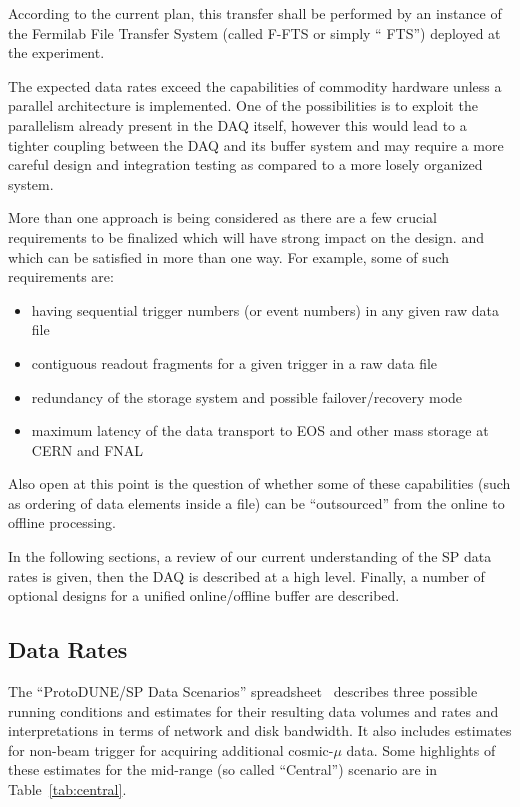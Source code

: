 \documentclass[pdftex,12pt,letter]{article}
\newcommand{\pd}{ProtoDUNE\xspace}
\begin{document}
According to the current plan, this transfer shall be performed by
an instance of the Fermilab File Transfer System (called F-FTS or simply `` FTS'') deployed
at the experiment.

The expected data rates exceed the capabilities of commodity hardware
unless a parallel architecture is implemented. One of the possibilities is to
exploit the parallelism already present in the DAQ itself, however this
would lead to a tighter coupling between the DAQ and its buffer system and
may require a more careful design and integration testing as compared to a more
losely organized system.

More than one approach is being considered as there are a few crucial
requirements to be finalized which will have strong impact on the design.
and which can be satisfied in more than one way. For example, some of such
requirements are:

\begin{itemize}

\item having sequential trigger numbers (or event numbers) in any given raw data file

\item contiguous readout fragments for a given trigger in a raw data file

\item redundancy of the storage system and possible failover/recovery mode

\item maximum latency of the data transport to EOS and other mass storage at CERN and FNAL

\end{itemize}

\noindent Also open at this point is the question of whether some of these capabilities (such as ordering of data elements
inside a file) can be ``outsourced'' from the online to offline processing.

In the following sections, a review of our current understanding of
the SP data rates is given, then the DAQ is described at a high level.
Finally, a number of optional designs for a unified online/offline
buffer are described.

\subsection{Data Rates}

The ``\pd/SP Data Scenarios'' spreadsheet~\cite{data-scenarios}
describes three possible running conditions and estimates for their
resulting data volumes and rates and interpretations in terms of
network and disk bandwidth.  It also includes estimates for non-beam
trigger for acquiring additional cosmic-$\mu$ data.  Some highlights
of these estimates for the mid-range (so called ``Central'')
scenario are in Table~\ref{tab:central}.
\end{document}
